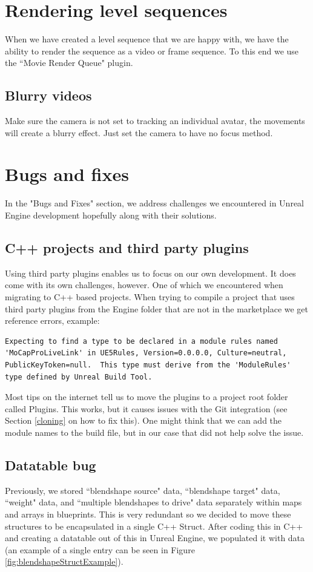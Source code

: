 \documentclass{uva-inf-article}
\begin{document}
\section{Rendering level sequences}
When we have created a level sequence that we are happy with, we have the ability to render the sequence as a video or frame sequence. To this end we use the ``Movie Render Queue" plugin.

\subsection{Blurry videos}
Make sure the camera is not set to tracking an individual avatar, the movements will create a blurry effect. Just set the camera to have no focus method.

\section{Bugs and fixes}
In the "Bugs and Fixes" section, we address challenges we encountered in Unreal Engine development hopefully along with their solutions.

\subsection{C++ projects and third party plugins}\label{cppThirdPartyPluginsBug}
Using third party plugins enables us to focus on our own development. It does come with its own challenges, however. One of which we encountered when migrating to C++ based projects. When trying to compile a project that uses third party plugins from the Engine folder that are not in the marketplace we get reference errors, example:
\begin{lstlisting}
Expecting to find a type to be declared in a module rules named 'MoCapProLiveLink' in UE5Rules, Version=0.0.0.0, Culture=neutral, PublicKeyToken=null.  This type must derive from the 'ModuleRules' type defined by Unreal Build Tool.
\end{lstlisting}
Most tips on the internet tell us to move the plugins to a project root folder called Plugins. This works, but it causes issues with the Git integration (see Section \ref{cloning} on how to fix this). One might think that we can add the module names to the build file, but in our case that did not help solve the issue.

\subsection{Datatable bug}\label{datatableBug}
Previously, we stored ``blendshape source" data, ``blendshape target" data, ``weight" data, and ``multiple blendshapes to drive" data separately within maps and arrays in blueprints. This is very redundant so we decided to move these structures to be encapsulated in a single C++ Struct. After coding this in C++ and creating a datatable out of this in Unreal Engine, we populated it with data (an example of a single entry can be seen in Figure \ref{fig:blendshapeStructExample}).
\end{document}
